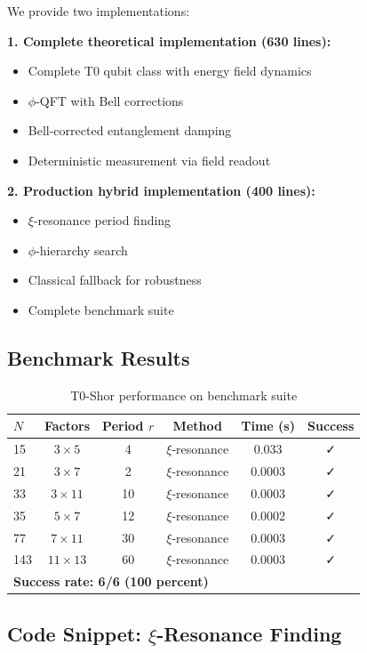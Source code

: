 We provide two implementations:

\textbf{1. Complete theoretical implementation (630 lines):}
\begin{itemize}
	\item Complete T0 qubit class with energy field dynamics
	\item $\phi$-QFT with Bell corrections
	\item Bell-corrected entanglement damping
	\item Deterministic measurement via field readout
\end{itemize}

\textbf{2. Production hybrid implementation (400 lines):}
\begin{itemize}
	\item $\xi$-resonance period finding
	\item $\phi$-hierarchy search
	\item Classical fallback for robustness
	\item Complete benchmark suite
\end{itemize}

\subsection{Benchmark Results}

\begin{table}[h]
	\centering
	\caption{T0-Shor performance on benchmark suite}
	\label{tab:benchmark}
	\begin{tabular}{@{}lccccc@{}}
		\toprule
		$N$ & Factors & Period $r$ & Method & Time (s) & Success \\
		\midrule
		15 & $3 \times 5$ & 4 & $\xi$-resonance & 0.033 & ✓ \\
		21 & $3 \times 7$ & 2 & $\xi$-resonance & 0.0003 & ✓ \\
		33 & $3 \times 11$ & 10 & $\xi$-resonance & 0.0003 & ✓ \\
		35 & $5 \times 7$ & 12 & $\xi$-resonance & 0.0002 & ✓ \\
		77 & $7 \times 11$ & 30 & $\xi$-resonance & 0.0003 & ✓ \\
		143 & $11 \times 13$ & 60 & $\xi$-resonance & 0.0003 & ✓ \\
		\midrule
		\multicolumn{5}{l}{\textbf{Success rate: 6/6 (100 percent)}} \\
		\bottomrule
	\end{tabular}
\end{table}

\subsection{Code Snippet: $\xi$-Resonance Finding}

